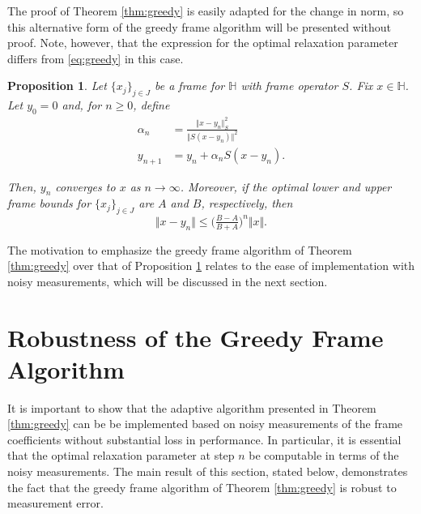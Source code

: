 \documentclass[11pt]{amsart}
\newcounter{Theorem}
\numberwithin{Theorem}{section}
\newtheorem{proposition}[Theorem]{Proposition}
\theoremstyle{definition}
\begin{document}
\noindent
The proof of Theorem \ref{thm:greedy} is easily adapted for the change in norm, so this alternative form of the greedy frame algorithm will be presented without proof.  Note, however, that the expression for the optimal relaxation parameter differs from \eqref{eq:greedy} in this case.


\begin{proposition} \label{thm:greedyprop}
Let $\lbrace x_{j} \rbrace_{j\in J}$ be a frame for $\mathbb{H}$ with frame operator $S$.  Fix $x \in \mathbb{H}$.  Let $y_{0}=0$ and, for $n\ge 0$, define
\begin{equation} \label{eq:alpha}
\begin{aligned}
\alpha_{n} &= \frac{\Vert x-y_{n}\Vert_{S}^{2}}{\Vert S(x-y_{n})\Vert^{2}} \\[4pt]
y_{n+1} &= y_{n} + \alpha_{n} S(x-y_{n}).
\end{aligned}
\end{equation}

\noindent
Then, $y_{n}$ converges to $x$ as $n\rightarrow \infty$.  Moreover, if the optimal lower and upper frame bounds for $\lbrace x_{j} \rbrace_{j\in J}$ are $A$ and $B$, respectively, then
\begin{equation} \label{eq:errorbound}
\Vert x-y_{n} \Vert \le \big ( \tfrac{B-A}{B+A} \big )^{n} \Vert x \Vert.
\end{equation}
\end{proposition}

The motivation to emphasize the greedy frame algorithm of Theorem \ref{thm:greedy} over that of Proposition \ref{thm:greedyprop} relates to the ease of implementation with noisy measurements, which will be discussed in the next section.


\section{Robustness of the Greedy Frame Algorithm} \label{section:4}

It is important to show that the adaptive algorithm presented in Theorem \ref{thm:greedy} can be be implemented based on noisy measurements of the frame coefficients without substantial loss in performance.  In particular, it is essential that the optimal relaxation parameter at step $n$ be computable in terms of the noisy measurements.  The main result of this section, stated below, demonstrates the fact that the greedy frame algorithm of Theorem \ref{thm:greedy} is robust to measurement error.
\end{document}
